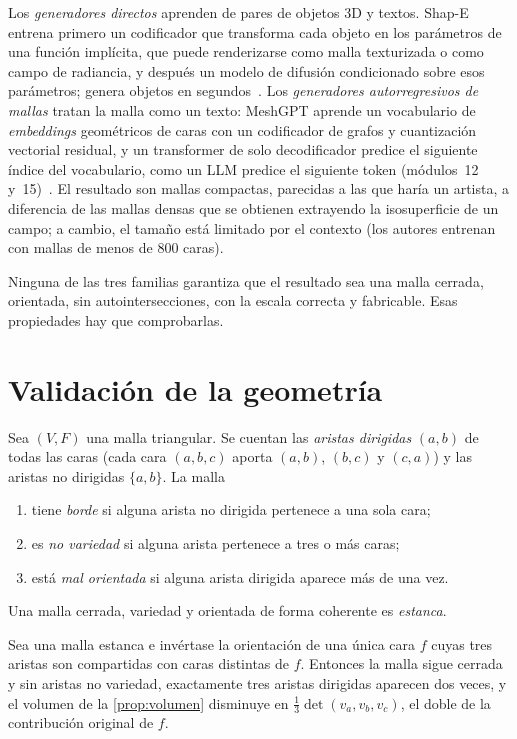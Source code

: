 Los \emph{generadores directos} aprenden de pares de objetos 3D y textos. Shap-E entrena primero un codificador que transforma cada objeto en los parámetros de una función implícita, que puede renderizarse como malla texturizada o como campo de radiancia, y después un modelo de difusión condicionado sobre esos parámetros; genera objetos en segundos~\cite{shape}. Los \emph{generadores autorregresivos de mallas} tratan la malla como un texto: MeshGPT aprende un vocabulario de \emph{embeddings} geométricos de caras con un codificador de grafos y cuantización vectorial residual, y un transformer de solo decodificador predice el siguiente índice del vocabulario, como un LLM predice el siguiente token (módulos~12 y~15)~\cite{meshgpt}. El resultado son mallas compactas, parecidas a las que haría un artista, a diferencia de las mallas densas que se obtienen extrayendo la isosuperficie de un campo; a cambio, el tamaño está limitado por el contexto (los autores entrenan con mallas de menos de 800 caras).

Ninguna de las tres familias garantiza que el resultado sea una malla cerrada, orientada, sin autointersecciones, con la escala correcta y fabricable. Esas propiedades hay que comprobarlas.

\section{Validación de la geometría}

\begin{definicion}\label{def:validacion}
Sea $(V,F)$ una malla triangular. Se cuentan las \emph{aristas dirigidas} $(a,b)$ de todas las caras (cada cara $(a,b,c)$ aporta $(a,b)$, $(b,c)$ y $(c,a)$) y las aristas no dirigidas $\{a,b\}$. La malla
\begin{enumerate}
  \item tiene \emph{borde} si alguna arista no dirigida pertenece a una sola cara;
  \item es \emph{no variedad} si alguna arista pertenece a tres o más caras;
  \item está \emph{mal orientada} si alguna arista dirigida aparece más de una vez.
\end{enumerate}
Una malla cerrada, variedad y orientada de forma coherente es \emph{estanca}.
\end{definicion}

\begin{proposicion}\label{prop:cara-girada}
Sea una malla estanca e invértase la orientación de una única cara $f$ cuyas tres aristas son compartidas con caras distintas de $f$. Entonces la malla sigue cerrada y sin aristas no variedad, exactamente tres aristas dirigidas aparecen dos veces, y el volumen de la \cref{prop:volumen} disminuye en $\tfrac13\det(v_a,v_b,v_c)$, el doble de la contribución original de $f$.
\end{proposicion}

